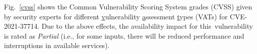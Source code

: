 



Fig.~\ref{cvss} shows the Common Vulnerability Scoring System
grades (CVSS) given by security experts for
different \underline{v}ulnerability \underline{a}ssessment
\underline{t}ypes (VATs) for CVE-2021-37714. Due to the above effects,
the availability impact for this~vulnerability is rated as {\em
  Partial} (i.e., for some inputs, there will be reduced performance
and interruptions in available services).


